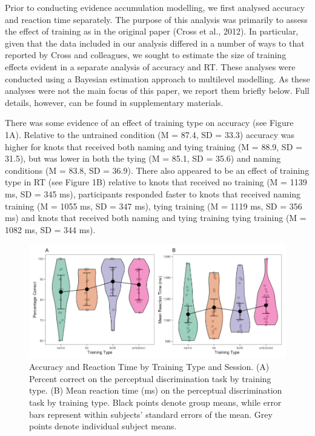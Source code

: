 \documentclass[
  man, donotrepeattitle,floatsintext]{apa6}
\begin{document}
Prior to conducting evidence accumulation modelling, we first analysed accuracy and reaction time separately. The purpose of this analysis was primarily to assess the effect of training as in the original paper (Cross et al., 2012). In particular, given that the data included in our analysis differed in a number of ways to that reported by Cross and colleagues, we sought to estimate the size of training effects evident in a separate analysis of accuracy and RT. These analyses were conducted using a Bayesian estimation approach to multilevel modelling. As these analyses were not the main focus of this paper, we report them briefly below. Full details, however, can be found in supplementary materials.

There was some evidence of an effect of training type on accuracy (see Figure 1A). Relative to the untrained condition (M = 87.4, SD = 33.3) accuracy was higher for knots that received both naming and tying training (M = 88.9, SD = 31.5), but was lower in both the tying (M = 85.1, SD = 35.6) and naming conditions (M = 83.8, SD = 36.9). There also appeared to be an effect of training type in RT (see Figure 1B) relative to knots that received no training (M = 1139 ms, SD = 345 ms), participants responded faster to knots that received naming training (M = 1055 ms, SD = 347 ms), tying training (M = 1119 ms, SD = 356 ms) and knots that received both naming and tying training tying training (M = 1082 ms, SD = 344 ms).



\begin{figure}[H]

{\centering \includegraphics[height=0.67\textheight,]{../figures/from_file/acc_rt} 

}

\caption{Accuracy and Reaction Time by Training Type and Session. (A) Percent correct on the perceptual discrimination task by training type. (B) Mean reaction time (ms) on the perceptual discrimination task by training type. Black points denote group means, while error bars represent within subjects' standard errors of the mean. Grey points denote individual subject means.}\label{fig:accuracy-rt-plot}
\end{figure}
\end{document}
